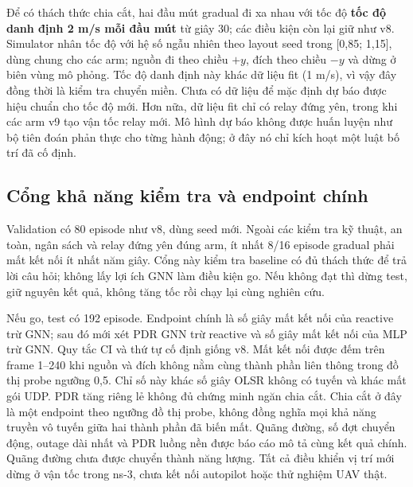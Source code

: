 Để có thách thức chia cắt, hai đầu mút gradual đi xa nhau với tốc độ
\textbf{tốc độ danh định 2 m/s mỗi đầu mút} từ giây 30; các điều kiện còn lại giữ như v8.
Simulator nhân tốc độ với hệ số ngẫu nhiên theo layout seed trong [0,85; 1,15],
dùng chung cho các arm; nguồn đi theo chiều $+y$, đích theo chiều $-y$ và dừng
ở biên vùng mô phỏng. Tốc độ danh định này khác dữ liệu fit (1 m/s), vì vậy đây đồng thời là kiểm tra chuyển
miền. Chưa có dữ liệu để mặc định dự báo được hiệu chuẩn cho tốc độ mới.
Hơn nữa, dữ liệu fit chỉ có relay đứng yên, trong khi các arm v9 tạo vận tốc
relay mới. Mô hình dự báo không được huấn luyện như bộ tiên đoán phản thực
cho từng hành động; ở đây nó chỉ kích hoạt một luật bố trí đã cố định.

\subsection{Cổng khả năng kiểm tra và endpoint chính}
Validation có 80 episode như v8, dùng seed mới. Ngoài các kiểm tra kỹ thuật,
an toàn, ngân sách và relay đứng yên đúng arm, ít nhất 8/16 episode gradual
 phải mất kết nối ít nhất năm giây. Cổng này kiểm tra baseline
có đủ thách thức để trả lời câu hỏi; không lấy lợi ích GNN làm điều kiện go.
Nếu không đạt thì dừng test, giữ nguyên kết quả, không tăng tốc rồi chạy lại
cùng nghiên cứu.

Nếu go, test có 192 episode. Endpoint chính là số giây mất kết nối của
reactive trừ GNN; sau đó mới xét PDR GNN trừ reactive và số giây mất kết nối
của MLP trừ GNN. Quy tắc CI và thứ tự cố định giống v8. Mất kết nối được đếm
trên frame 1--240 khi nguồn và đích không nằm cùng thành phần liên thông
trong đồ thị probe ngưỡng 0,5. Chỉ số này khác số giây OLSR không có tuyến
và khác mất gói UDP. PDR tăng riêng lẻ không đủ chứng minh ngăn chia cắt.
Chia cắt ở đây là một endpoint theo ngưỡng đồ thị probe, không đồng nghĩa
mọi khả năng truyền vô tuyến giữa hai thành phần đã biến mất.
Quãng đường, số đợt chuyển động, outage dài nhất và PDR luồng nền được báo
cáo mô tả cùng kết quả chính. Quãng đường chưa được chuyển thành năng lượng.
Tất cả điều khiển vị trí mới dừng ở vận tốc trong ns-3, chưa kết nối autopilot
hoặc thử nghiệm UAV thật.
